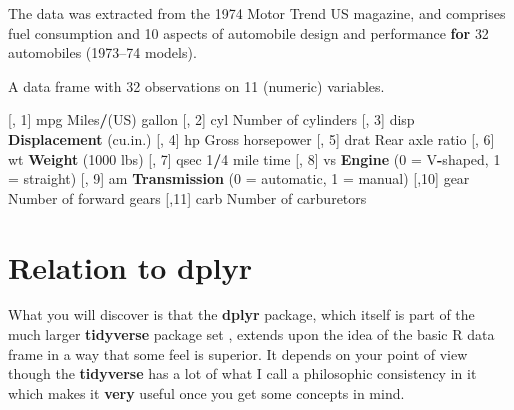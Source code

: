 \documentclass[]{book}
\newenvironment{Shaded}{\begin{snugshade}}{\end{snugshade}}
\newcommand{\KeywordTok}[1]{\textcolor[rgb]{0.13,0.29,0.53}{\textbf{#1}}}
\newcommand{\DecValTok}[1]{\textcolor[rgb]{0.00,0.00,0.81}{#1}}
\newcommand{\StringTok}[1]{\textcolor[rgb]{0.31,0.60,0.02}{#1}}
\newcommand{\ControlFlowTok}[1]{\textcolor[rgb]{0.13,0.29,0.53}{\textbf{#1}}}
\newcommand{\OperatorTok}[1]{\textcolor[rgb]{0.81,0.36,0.00}{\textbf{#1}}}
\newcommand{\NormalTok}[1]{#1}
\begin{document}
\begin{Shaded}
\begin{Highlighting}[]
\NormalTok{The data was extracted from the }\DecValTok{1974}\NormalTok{ Motor Trend US }
\NormalTok{magazine, and comprises fuel consumption and }\DecValTok{10}\NormalTok{ aspects }
\NormalTok{of automobile design and performance }\ControlFlowTok{for} \DecValTok{32}\NormalTok{ automobiles }
\NormalTok{(}\DecValTok{1973}\NormalTok{–}\DecValTok{74}\NormalTok{ models).}

\NormalTok{A data frame with }\DecValTok{32}\NormalTok{ observations on }\DecValTok{11}\NormalTok{ (numeric) }
\NormalTok{variables.}

\NormalTok{[, }\DecValTok{1}\NormalTok{]   mpg Miles}\OperatorTok{/}\NormalTok{(US) gallon}
\NormalTok{[, }\DecValTok{2}\NormalTok{]   cyl Number of cylinders}
\NormalTok{[, }\DecValTok{3}\NormalTok{]   disp    }\KeywordTok{Displacement}\NormalTok{ (cu.in.)}
\NormalTok{[, }\DecValTok{4}\NormalTok{]   hp  Gross horsepower}
\NormalTok{[, }\DecValTok{5}\NormalTok{]   drat    Rear axle ratio}
\NormalTok{[, }\DecValTok{6}\NormalTok{]   wt  }\KeywordTok{Weight}\NormalTok{ (}\DecValTok{1000}\NormalTok{ lbs)}
\NormalTok{[, }\DecValTok{7}\NormalTok{]   qsec    }\DecValTok{1}\OperatorTok{/}\DecValTok{4}\NormalTok{ mile time}
\NormalTok{[, }\DecValTok{8}\NormalTok{]   vs  }\KeywordTok{Engine}\NormalTok{ (}\DecValTok{0}\NormalTok{ =}\StringTok{ }\NormalTok{V}\OperatorTok{-}\NormalTok{shaped, }\DecValTok{1}\NormalTok{ =}\StringTok{ }\NormalTok{straight)}
\NormalTok{[, }\DecValTok{9}\NormalTok{]   am  }\KeywordTok{Transmission}\NormalTok{ (}\DecValTok{0}\NormalTok{ =}\StringTok{ }\NormalTok{automatic, }\DecValTok{1}\NormalTok{ =}\StringTok{ }\NormalTok{manual)}
\NormalTok{[,}\DecValTok{10}\NormalTok{]   gear    Number of forward gears}
\NormalTok{[,}\DecValTok{11}\NormalTok{]   carb    Number of carburetors}
\end{Highlighting}
\end{Shaded}

\section{Relation to dplyr}\label{relation-to-dplyr}

What you will discover is that the \textbf{dplyr} package, which itself
is part of the much larger \textbf{tidyverse} package set , extends upon
the idea of the basic R data frame in a way that some feel is superior.
It depends on your point of view though the \textbf{tidyverse} has a lot
of what I call a philosophic consistency in it which makes it
\textbf{very} useful once you get some concepts in mind.
\end{document}
